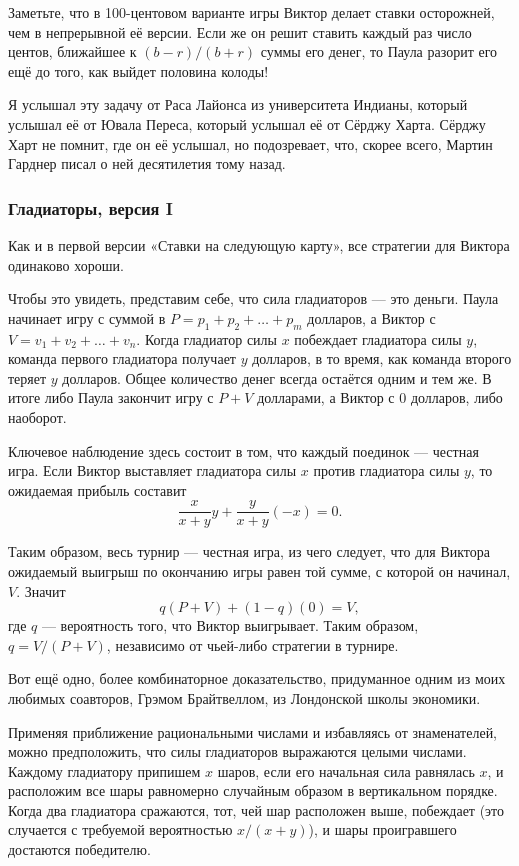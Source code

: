 Заметьте, что в 100-центовом варианте игры Виктор делает ставки осторожней, чем в непрерывной её версии.
Если же он решит ставить каждый раз число центов, ближайшее к $(b - r)/(b + r)$ суммы его денег, то Паула разорит его ещё до того, как выйдет половина колоды!

\medskip

Я услышал эту задачу от Раса Лайонса из университета Индианы, %
который услышал её от Ювала Переса, %
который услышал её от Сёрджу Харта. %
Сёрджу Харт не помнит, где он её услышал, но подозревает, что, скорее всего, Мартин Гарднер писал о ней десятилетия тому назад.

\subsubsection*{Гладиаторы, версия I}%

Как и в первой версии «Ставки на следующую карту», все стратегии для Виктора одинаково хороши.

Чтобы это увидеть, представим себе, что сила гладиаторов --- это деньги.
Паула начинает игру с суммой в $P = p_1 + p_2 + \dots + p_m$ долларов, 
а Виктор с $V = v_1 + v_2 + \dots + v_n$.
Когда гладиатор силы $x$ побеждает гладиатора силы $y$, команда первого гладиатора получает $y$ долларов, в то время, как команда второго теряет $y$ долларов.
Общее количество денег всегда остаётся одним и тем же.
В итоге либо Паула закончит игру с $P+V$ долларами, а Виктор с $0$ долларов, либо наоборот.

Ключевое наблюдение здесь состоит в том, что каждый поединок --- честная игра.
Если Виктор выставляет гладиатора силы $x$ против гладиатора силы $y$, то ожидаемая прибыль составит 
\[\frac{x}{x+y}y + \frac{y}{x+y}(-x) =0.\]

Таким образом, весь турнир --- честная игра, из чего следует, что для Виктора ожидаемый выигрыш по окончанию игры равен той сумме, с которой он начинал, $V$.
Значит
\[q(P + V) + (1-q)(0) = V,\]
где $q$ --- вероятность того, что Виктор выигрывает.
Таким образом, $q = V/(P+V)$,
независимо от чьей-либо стратегии в турнире.
\heart

Вот ещё одно, более комбинаторное доказательство, придуманное одним из моих любимых соавторов, Грэмом Брайтвеллом, из Лондонской школы экономики. %

Применяя приближение рациональными числами и избавляясь от знаменателей, можно предположить, что силы гладиаторов выражаются целыми числами.
Каждому гладиатору припишем $x$ шаров, если его начальная сила равнялась $x$, и расположим все шары равномерно случайным образом в вертикальном порядке.
Когда два гладиатора сражаются, тот, чей шар расположен выше, побеждает (это случается с требуемой вероятностью $x/(x+y)$), и шары проигравшего достаются победителю.

